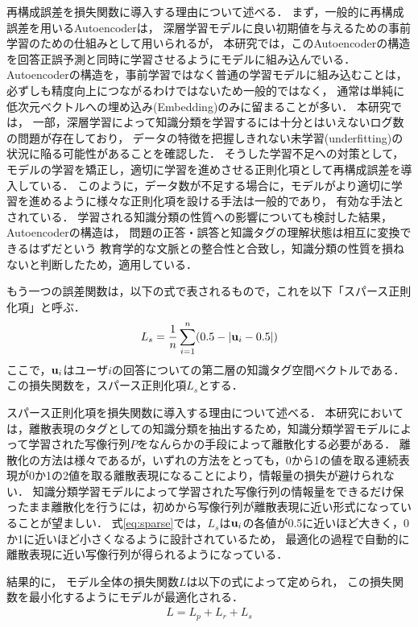 再構成誤差を損失関数に導入する理由について述べる．
まず，一般的に再構成誤差を用いるAutoencoderは，
深層学習モデルに良い初期値を与えるための事前学習のための仕組みとして用いられるが，
本研究では，このAutoencoderの構造を回答正誤予測と同時に学習させるようにモデルに組み込んでいる．
Autoencoderの構造を，事前学習ではなく普通の学習モデルに組み込むことは，
必ずしも精度向上につながるわけではないため一般的ではなく，
通常は単純に低次元ベクトルへの埋め込み(Embedding)のみに留まることが多い．
本研究では，
一部，深層学習によって知識分類を学習するには十分とはいえないログ数の問題が存在しており，
データの特徴を把握しきれない未学習(underfitting)の状況に陥る可能性があることを確認した．
そうした学習不足への対策として，モデルの学習を矯正し，適切に学習を進めさせる正則化項として再構成誤差を導入している．
このように，データ数が不足する場合に，モデルがより適切に学習を進めるように様々な正則化項を設ける手法は一般的であり，
有効な手法とされている．
学習される知識分類の性質への影響についても検討した結果，
Autoencoderの構造は，
問題の正答・誤答と知識タグの理解状態は相互に変換できるはずだという
教育学的な文脈との整合性と合致し，知識分類の性質を損ねないと判断したため，適用している．


もう一つの誤差関数は，以下の式で表されるもので，これを以下「スパース正則化項」と呼ぶ．
\begin{eqnarray}
\label{eq:sparse}
L_s = {1\over n}\sum_{i=1}^n (0.5 - |{\bf u}_i - 0.5|)
\end{eqnarray}
ここで，${\bf u}_i$はユーザ$i$の回答についての第二層の知識タグ空間ベクトルである．
この損失関数を，スパース正則化項$L_s$とする．

スパース正則化項を損失関数に導入する理由について述べる．
本研究においては，離散表現のタグとしての知識分類を抽出するため，知識分類学習モデルによって学習された写像行列$P$をなんらかの手段によって離散化する必要がある．
離散化の方法は様々であるが，いずれの方法をとっても，0から1の値を取る連続表現が0か1の2値を取る離散表現になることにより，情報量の損失が避けられない．
知識分類学習モデルによって学習された写像行列の情報量をできるだけ保ったまま離散化を行うには，初めから写像行列が離散表現に近い形式になっていることが望ましい．
式\ref{eq:sparse}では，$L_s$は${\bf u}_i$の各値が0.5に近いほど大きく，0か1に近いほど小さくなるように設計されているため，
最適化の過程で自動的に離散表現に近い写像行列が得られるようになっている．


結果的に，
モデル全体の損失関数$L$は以下の式によって定められ，
この損失関数を最小化するようにモデルが最適化される．
\begin{eqnarray}
\label{eq:total_loss}
{L = L_p + L_r + L_s}
\end{eqnarray}


